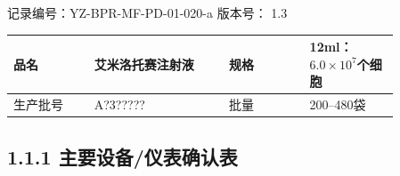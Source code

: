 \documentclass[UTF8,10pt,a4paper,fontset=fandol]{ctexart}
\newcommand{\fieldvalue}[1]{#1}
\newcommand{\handwritten}[1]{#1}
\begin{document}
记录编号：YZ-BPR-MF-PD-01-020-a\hfill
版本号：
\fieldvalue{1.3}

\begin{center}
\begin{tabular}{|p{0.18\linewidth}|p{0.30\linewidth}|p{0.18\linewidth}|p{0.20\linewidth}|}
\hline
品名 &
\fieldvalue{艾米洛托赛注射液} &
规格 &
\fieldvalue{12ml：$6.0\times10^{7}$个细胞}
\\ \hline
生产批号 &
\fieldvalue{\handwritten{A?3?????}} &
批量 &
\fieldvalue{200--480袋}
\\ \hline
\end{tabular}
\end{center}

\subsection*{1.1.1 主要设备/仪表确认表}
\end{document}

